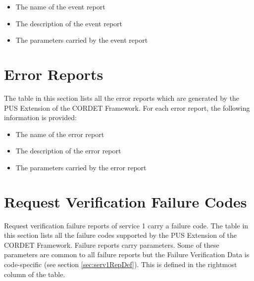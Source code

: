 \documentclass{pnp_article}
\begin{document}
\begin{itemize}
\item The name of the event report
\item The description of the event report
\item The parameters carried by the event report
\end{itemize}

\begin{landscape} 


\end{landscape}


\section{Error Reports}\label{sec:errRep}
The table in this section lists all the error reports which are generated by the PUS Extension of the CORDET Framework. For each error report, the following information is provided:

\begin{itemize}
\item The name of the error report
\item The description of the error report
\item The parameters carried by the error report
\end{itemize}

\begin{landscape} 




\end{landscape}

\section{Request Verification Failure Codes}\label{sec:reqVerFailCodes}
Request verification failure reports of service 1 carry a failure code. The table in this section lists all the failure codes supported by the PUS Extension of the CORDET Framework. Failure reports carry parameters. Some of these parameters are common to all failure reports but the Failure Verification Data is code-specific (see section \ref{sec:serv1RepDef}). This is defined in the rightmost column of the table.
\end{document}
